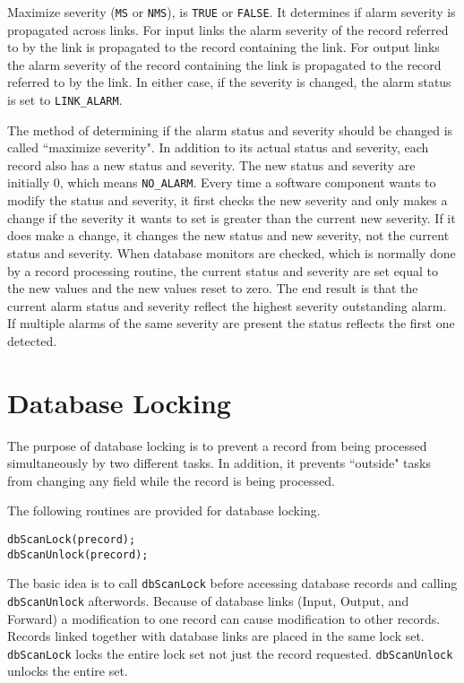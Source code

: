 Maximize severity (\verb|MS| or \verb|NMS|), is \verb|TRUE| or \verb|FALSE|.  It determines if alarm severity is propagated across links. For input 
links the alarm severity of the record referred to by the link is propagated to the record containing the link. For output 
links the alarm severity of the record containing the link is propagated to the record referred to by the link. In either case, 
if the severity is changed, the alarm status is set to \verb|LINK_ALARM|.

The method of determining if the alarm status and severity should be changed is called ``maximize severity". In addition 
to its actual status and severity, each record also has a new status and severity. The new status and severity are initially 0, 
which means \verb|NO_ALARM|. Every time a software component wants to modify the status and severity, it first checks the 
new severity and only makes a change if the severity it wants to set is greater than the current new severity. If it does make 
a change, it changes the new status and new severity, not the current status and severity. When database monitors are 
checked, which is normally done by a record processing routine, the current status and severity are set equal to the new 
values and the new values reset to zero. The end result is that the current alarm status and severity reflect the highest 
severity outstanding alarm. If multiple alarms of the same severity are present the status reflects the first one detected.

\section{Database Locking}

The purpose of database locking is to prevent a record from being processed simultaneously by two different tasks. In 
addition, it prevents ``outside" tasks from changing any field while the record is being processed.

The following routines are provided for database locking.

\begin{verbatim}dbScanLock(precord);
dbScanUnlock(precord);
\end{verbatim}
The basic idea is to call \verb|dbScanLock| before accessing database records and calling \verb|dbScanUnlock| afterwords. 
Because of database links (Input, Output, and Forward) a modification to one record can cause modification to other 
records. Records linked together with database links are placed in the same lock set. \verb|dbScanLock| locks the entire lock 
set not just the record requested. \verb|dbScanUnlock| unlocks the entire set.

